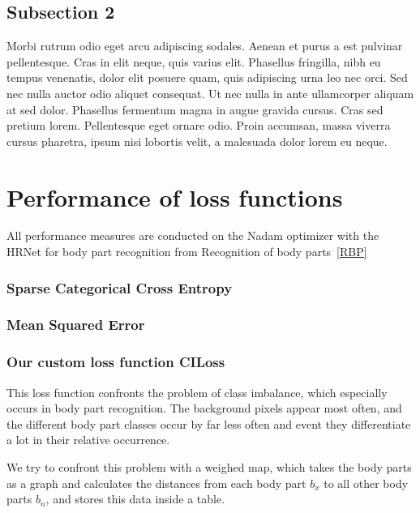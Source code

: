 \subsection{Subsection 2}
Morbi rutrum odio eget arcu adipiscing sodales. Aenean et purus a est pulvinar pellentesque. Cras in elit neque, quis
varius elit. Phasellus fringilla, nibh eu tempus venenatis, dolor elit posuere quam, quis adipiscing urna leo nec
orci. Sed nec nulla auctor odio aliquet consequat. Ut nec nulla in ante ullamcorper aliquam at sed dolor. Phasellus
fermentum magna in augue gravida cursus. Cras sed pretium lorem. Pellentesque eget ornare odio. Proin accumsan, massa
viverra cursus pharetra, ipsum nisi lobortis velit, a malesuada dolor lorem eu neque.



\section{Performance of loss functions}
All performance measures are conducted on the Nadam optimizer with the HRNet for body part recognition from
Recognition of body parts~\ref{RBP}

\subsubsection{Sparse Categorical Cross Entropy}

\subsubsection{Mean Squared Error}

\subsubsection{Our custom loss function CILoss}
This loss function confronts the problem of class imbalance, which especially occurs in body part recognition.
The background pixels appear most often, and the different body part classes occur by far less often and event they
differentiate a lot in their relative occurrence.

We try to confront this problem with a weighed map, which takes the body parts as a graph and calculates
the distances from each body part $b_x$ to all other body parts $b_n$, and stores this data inside a table.


